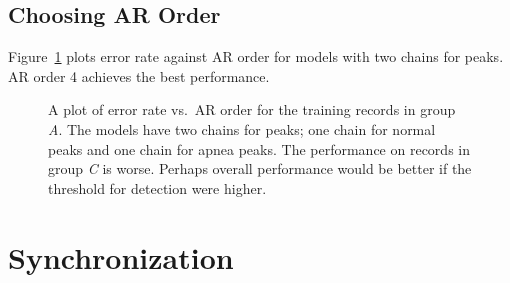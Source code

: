 \documentclass[12pt]{article}
\begin{document}
\begin{table*}
  \centering
  
  \caption[Performance]{Performance of pass1 combined with pass2 on
    training data with model
    \emph{two\_ar3\_masked6.1} for pass2.}
  \label{tab:score_initial}
\end{table*}

\subsection{Choosing AR Order}
\label{sec:ar_order}

Figure~\ref{fig:errors_vs_ar_order} plots error rate against AR order for models
with two chains for peaks.  AR order 4 achieves the best performance.  

\begin{figure}
  \centering
    \caption{A plot of error rate vs.\ AR order for the training
      records in group \emph{A}.  The models have two chains for
      peaks; one chain for normal peaks and one chain for apnea
      peaks.  The performance on records in group \emph{C} is worse.
      Perhaps overall performance would be better if the threshold for
      detection were higher.}
  \label{fig:errors_vs_ar_order}
\end{figure}

\section{Synchronization}
\label{sec:sync}
\end{document}
